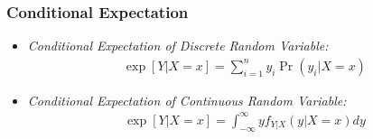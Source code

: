 

\begin{frame}
\frametitle{Conditional Expectation}
\begin{itemize}
\item \emph{Conditional Expectation of Discrete Random Variable:}
\begin{align*}
\exp[Y|X=x] = \sum_{i=1}^n y_i \Pr(y_i|X=x)
\end{align*}
\item \emph{Conditional Expectation of Continuous Random Variable:}
\begin{align*}
\exp[Y|X=x] = \int_{-\infty}^\infty y f_{Y|X}(y|X=x) dy
\end{align*}
\end{itemize}
\end{frame}

